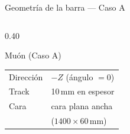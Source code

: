 \documentclass[aspectratio=169,10pt]{beamer}
\begin{document}
\begin{frame}{Geometría de la barra — Caso A}
\begin{columns}[T]
\begin{column}{0.40\textwidth}
  \begin{block}{Muón (Caso A)}
    \begin{tabular}{@{}ll@{}}
      Dirección & $-Z$ (ángulo $=0$) \\
      Track     & 10\,mm en espesor \\
      Cara      & cara plana ancha \\
                & ($1400\times60$\,mm) \\
    \end{tabular}
  \end{block}
  \end{column}
\end{columns}
\end{frame}

\end{document}
